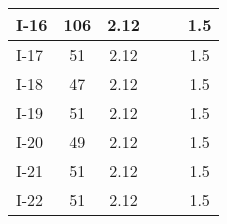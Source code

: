 \begin{table}[!ht]
\begin{center}
\begin{tabular}{|l|c|c||l|c|c|}
I-16       &  106              &  2.12      &            &                   &  1.5       \\ \hline
I-17       &  51               &  2.12      &            &                   &  1.5       \\ \hline
I-18       &  47               &  2.12      &            &                   &  1.5       \\ \hline
I-19       &  51               &  2.12      &            &                   &  1.5       \\ \hline
I-20       &  49               &  2.12      &            &                   &  1.5       \\ \hline
I-21       &  51               &  2.12      &            &                   &  1.5       \\ \hline
I-22       &  51               &  2.12      &            &                   &  1.5       \\ \hline
\end{tabular}
\end{center}
\end{table}


\clearpage






